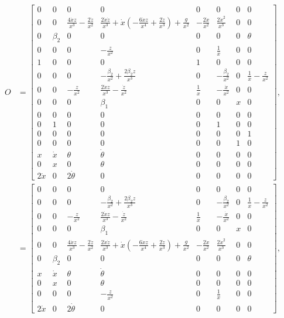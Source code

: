 \documentclass[12pt]{article}
\begin{document}
\begin{align*}
    O &=
    \left[\begin{matrix}0 & 0 & 0 & 0 & 0 & 0 & 0 & 0\\0 & 0 & \frac{4 \dot{x} z}{x^{3}} - \frac{2 \dot{z}}{x^{2}} & \frac{2 \dot{x} \dot{z}}{x^{3}} + \dot{x} \left(- \frac{6 \dot{x} z}{x^{4}} + \frac{2 \dot{z}}{x^{3}}\right) + \frac{g}{x^{2}} & - \frac{2 \dot{x}}{x^{2}} & \frac{2 \dot{x}^{2}}{x^{3}} & 0 & 0\\0 & \beta_{2} & 0 & 0 & 0 & 0 & 0 & \theta\\0 & 0 & 0 & - \frac{z}{x^{2}} & 0 & \frac{1}{x} & 0 & 0\\1 & 0 & 0 & 0 & 1 & 0 & 0 & 0\\0 & 0 & 0 & - \frac{\beta_{2}}{x^{2}} + \frac{2 \beta_{2} z}{x^{3}} & 0 & - \frac{\beta_{2}}{x^{2}} & 0 & \frac{1}{x} - \frac{z}{x^{2}}\\0 & 0 & - \frac{z}{x^{2}} & \frac{2 \dot{x} z}{x^{3}} - \frac{\dot{z}}{x^{2}} & \frac{1}{x} & - \frac{\dot{x}}{x^{2}} & 0 & 0\\0 & 0 & 0 & \beta_{1} & 0 & 0 & x & 0\\0 & 0 & 0 & 0 & 0 & 0 & 0 & 0\\0 & 1 & 0 & 0 & 0 & 1 & 0 & 0\\0 & 0 & 0 & 0 & 0 & 0 & 0 & 1\\0 & 0 & 0 & 0 & 0 & 0 & 1 & 0\\x & \dot{x} & \theta & \dot{\theta} & 0 & 0 & 0 & 0\\0 & x & 0 & \theta & 0 & 0 & 0 & 0\\2 \dot{x} & 0 & 2 \dot{\theta} & 0 & 0 & 0 & 0 & 0\end{matrix}\right], \\
    &=
    \left[\begin{matrix}0 & 0 & 0 & 0 & 0 & 0 & 0 & 0\\0 & 0 & 0 & - \frac{\beta_{2}}{x^{2}} + \frac{2 \beta_{2} z}{x^{3}} & 0 & - \frac{\beta_{2}}{x^{2}} & 0 & \frac{1}{x} - \frac{z}{x^{2}}\\0 & 0 & - \frac{z}{x^{2}} & \frac{2 \dot{x} z}{x^{3}} - \frac{\dot{z}}{x^{2}} & \frac{1}{x} & - \frac{\dot{x}}{x^{2}} & 0 & 0\\0 & 0 & 0 & \beta_{1} & 0 & 0 & x & 0\\0 & 0 & \frac{4 \dot{x} z}{x^{3}} - \frac{2 \dot{z}}{x^{2}} & \frac{2 \dot{x} \dot{z}}{x^{3}} + \dot{x} \left(- \frac{6 \dot{x} z}{x^{4}} + \frac{2 \dot{z}}{x^{3}}\right) + \frac{g}{x^{2}} & - \frac{2 \dot{x}}{x^{2}} & \frac{2 \dot{x}^{2}}{x^{3}} & 0 & 0\\0 & \beta_{2} & 0 & 0 & 0 & 0 & 0 & \theta\\x & \dot{x} & \theta & \dot{\theta} & 0 & 0 & 0 & 0\\0 & x & 0 & \theta & 0 & 0 & 0 & 0\\0 & 0 & 0 & - \frac{z}{x^{2}} & 0 & \frac{1}{x} & 0 & 0\\2 \dot{x} & 0 & 2 \dot{\theta} & 0 & 0 & 0 & 0 & 0\end{matrix}\right], \\

\end{align*}
\end{document}
